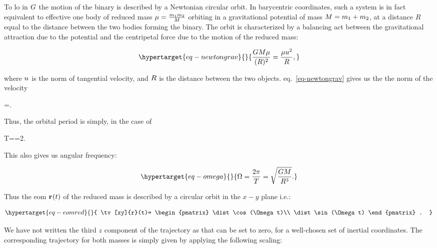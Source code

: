 \documentclass[
  11pt,
  a4paper,
  DIV=11,
  numbers=noendperiod,
  oneside]{scrreprt}
\let\[\relax \let\]\relax %
\DeclareRobustCommand{\[}{\begin{equation}}
\DeclareRobustCommand{\]}{\end{equation}}
\begin{document}
To \gls{lo} in \(\grav\) the motion of the binary is described by a
Newtonian circular orbit. In barycentric coordinates, such a system is
in fact equivalent to effective one body  of reduced mass
\(\redmass=\frac{\mass[1]\mass[2]}{\totmass}\) orbiting in a
gravitational potential of mass \(\totmass=\mass[1]+\mass[2]\), at a
distance \(R\) equal to the distance between the two bodies forming the
binary. The orbit is characterized by a balancing act between the
gravitational attraction due to the potential and the centripetal force
due to the motion of the reduced mass:

\begin{equation}\protect\hypertarget{eq-newtongrav}{}{
\frac{\grav \totmass\redmass}{\pa{\dist}^2}=\frac{\redmass \vel^2}{\dist},
}\label{eq-newtongrav}\end{equation}

where \(\vel\) is the norm of tangential velocity, and \(\dist\) is the
distance between the two objects. eq.~\ref{eq-newtongrav} gives us the
the norm of the velocity

\[
\vel=\sqrt{\frac{\grav \totmass}{\dist}}.
\]

Thus, the orbital period is simply, in the case of

\[
T=\frac{2\pi\dist}{\vel}=2\pi{}.
\]

This also gives us angular frequency:

\begin{equation}\protect\hypertarget{eq-omega}{}{  
\Omega=\frac{2\pi}{T}=\sqrt{\frac{\grav\totmass}{\dist^3}}.
}\label{eq-omega}\end{equation}

Thus the \gls{eom} \(\tv{r}(t)\) of the reduced mass is described by a
circular orbit in the \(x-y\) plane i.e.:

\begin{equation}\protect\hypertarget{eq-eomred}{}{
\tv[xy]{r}(t)= \begin{pmatrix} \dist \cos(\Omega t)\\ \dist \sin(\Omega t) \end{pmatrix} .
}\label{eq-eomred}\end{equation}

We have not written the third \(z\) component of the trajectory as that
can be set to zero, for a well-chosen set of inertial coordinates. The
corresponding trajectory for both masses is simply given by applying the
following scaling:
\end{document}
